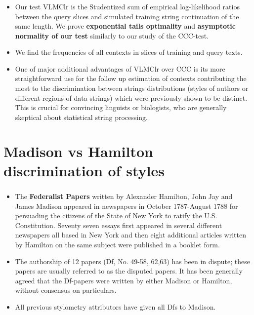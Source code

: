 \documentclass{beamer}
\begin{document}
\begin{frame}
\frametitle{}
\begin{itemize}
\item Our test VLMClr is the Studentized sum of empirical log-likelihood ratios between the  query slices and simulated  training string continuation of the same length. We prove {\bf exponential tails optimality} and {\bf asymptotic normality of our test} similarly to our study of the CCC-test.

\item We find the frequencies of all contexts in slices of training and query texts.

\item  One of major additional advantages of VLMClr over CCC is its more straightforward use for the follow up estimation of contexts contributing the most to the discrimination between strings distributions (styles of authors or different regions of data strings) which were previously shown to be distinct. This is crucial for convincing linguists or biologists, who are generally skeptical about statistical string processing.\
\end{itemize}
\end{frame}

\section{Madison vs Hamilton discrimination of styles}
\begin{frame}
\frametitle{}
\begin{itemize}
\item The {\bf Federalist Papers} written by Alexander Hamilton, John Jay and
James Madison appeared in newspapers in October 1787-August 1788 for
persuading the citizens of the State of New York to ratify the U.S. 
Constitution. Seventy seven essays first appeared in several
different newspapers all based in New York and then eight additional
articles written by Hamilton on the same subject were published in a
booklet form. 
\item  The
authorship of 12 papers (Df, No. 49-58, 62,63) has
been in dispute; these papers are usually referred to as the
disputed papers. It has been generally agreed that the Df-papers
were written by either Madison or Hamilton, without consensus on
particulars.
\item  All previous stylometry attributors have given all Dfs to Madison.
\end{itemize}
\end{frame}
\end{document}
